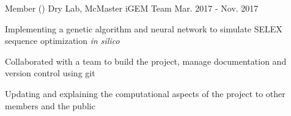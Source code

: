 \begin{cventries}
	\cventry
      {Member ()}
      {Dry Lab, McMaster iGEM Team}
      {Mar. 2017 - Nov. 2017}
      {}%
      {
        \begin{cvitems}
          \item{Implementing a genetic algorithm and neural network to simulate SELEX sequence optimization \textit{in silico}}
          \item{Collaborated with a team to build the project, manage documentation and version control using git}
          \item{Updating and explaining the computational aspects of the project to other members and the public}
        \end{cvitems}
      }
\end{cventries}
